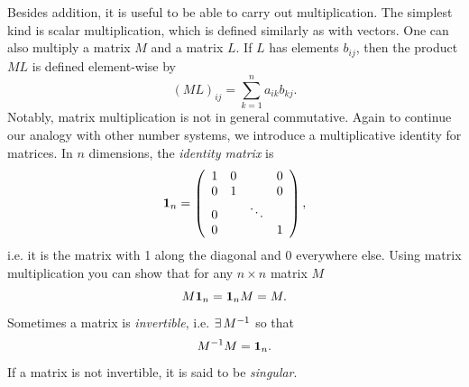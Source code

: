 Besides addition, it is useful to be able to carry out multiplication.
The simplest kind is scalar multiplication,
which is defined similarly as with vectors.
One can also multiply a matrix $M$ and a matrix $L$. If $L$ has elements
$b_{ij}$, then the product $ML$ is defined element-wise by
\begin{equation}
  (ML)_{ij}=\sum_{k=1}^n a_{ik}b_{kj}.
\end{equation}
Notably, matrix multiplication is not in general commutative.
Again to continue our analogy with other number systems,
we introduce a multiplicative identity for matrices.
In $n$ dimensions, the {\it identity matrix} is
\begin{equation}\index{identity!matrix}\index{matrix!identity}
  \id_n=\left(\begin{array}{cccc}
          1   & 0 &       & 0\\
          0   & 1 &       & 0\\
          0   &   & \ddots& \\
          0   &   &       & 1
            \end{array}\right), 
\end{equation}
i.e. it is the matrix with 1 along the diagonal and 0 everywhere else. Using
matrix multiplication you can show that for any $n\times n$ matrix $M$
\begin{equation}
  M{\mathbf 1}_n ={\mathbf 1}_n M = M.
\end{equation}
Sometimes a matrix is {\it invertible}, 
i.e. $\operatorname{\exists} M^{-1}$ so that
\begin{equation}
  M^{-1} M={\mathbf 1}_n. 
\end{equation}
If a matrix is not invertible, it is said to be 
{\it singular}.

